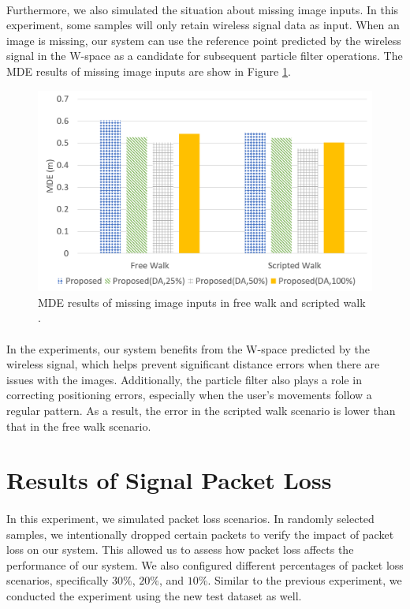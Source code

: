 \documentclass[a4paper,12pt]{report}
\begin{document}
\paragraph{}
Furthermore, we also simulated the situation about missing image inputs. In this experiment, some samples will only retain wireless signal data as input. When an image is missing, our system can use the reference point predicted by the wireless signal in the W-space as a candidate for subsequent particle filter operations. The MDE results of missing image inputs are show in Figure \ref{Fig:missing_i}.
\begin{figure}[h]
    \centering
    \includegraphics[width=0.65\columnwidth]{images/chap5-5/missing_i.png}
    \caption{MDE results of missing image inputs in free walk and scripted walk .}
    \label{Fig:missing_i}
\end{figure}
\paragraph{}
In the experiments, our system benefits from the W-space predicted by the wireless signal, which helps prevent significant distance errors when there are issues with the images. Additionally, the particle filter also plays a role in correcting positioning errors, especially when the user's movements follow a regular pattern. As a result, the error in the scripted walk scenario is lower than that in the free walk scenario.
\section{Results of Signal Packet Loss}
\paragraph{}
In this experiment, we simulated packet loss scenarios. In randomly selected samples, we intentionally dropped certain packets to verify the impact of packet loss on our system. This allowed us to assess how packet loss affects the performance of our system. We also configured different percentages of packet loss scenarios, specifically $30\%$, $20\%$, and $10\%$. Similar to the previous experiment, we conducted the experiment using the new test dataset as well.
\end{document}
